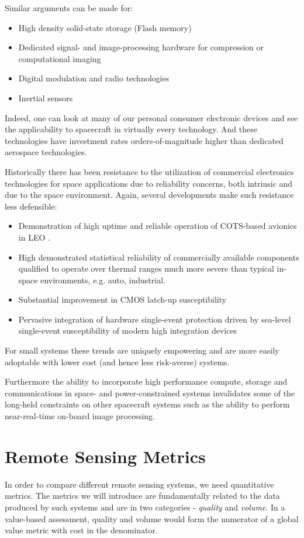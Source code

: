 \documentclass[10pt,journal]{IEEEtran}  %
\begin{document}
Similar arguments can be made for:

\begin{itemize}
    \item High density solid-state storage (Flash memory)
    \item Dedicated signal- and image-processing hardware for compression or computational imaging
    \item Digital modulation and radio technologies
    \item Inertial sensors
\end{itemize}

Indeed, one can look at many of our personal consumer electronic devices and see the applicability to spacecraft in virtually every technology.  And these technologies have investment rates orders-of-magnitude higher than dedicated aerospace technologies.

Historically there has been resistance to the utilization of commercial electronics technologies for space applications due to reliability concerns, both intrinsic and due to the space environment.  Again, several developments make such resistance less defensible:

\begin{itemize}
    \item Demonstration of high uptime and reliable operation of COTS-based avionics in LEO \cite{careful_cots}.
    \item High demonstrated statistical reliability of commercially available components qualified to operate over thermal ranges much more severe than typical in-space environments, e.g. auto, industrial.
    \item Substantial improvement in CMOS latch-up susceptibility
    \item Pervasive integration of hardware single-event protection driven by sea-level single-event susceptibility of modern high integration devices
\end{itemize}

For small systems these trends are uniquely empowering and are more easily adoptable with lower cost (and hence less risk-averse) systems.  

Furthermore the ability to incorporate high performance compute, storage and communications in space- and power-constrained systems invalidates some of the long-held constraints on other spacecraft systems such as the ability to perform near-real-time on-board image processing.

\section{Remote Sensing Metrics}
\label{sec:Metrics}
In order to compare different remote sensing systems, we need quantitative metrics.  The metrics we will introduce are fundamentally related to the data produced by such systems and are in two categories - \emph{quality} and \emph{volume}.  In a value-based assessment, quality and volume would form the numerator of a global value metric with cost in the denominator.
\end{document}

